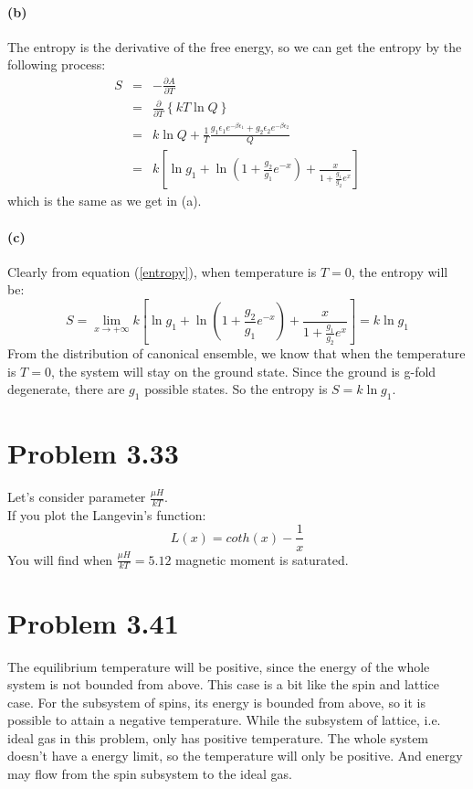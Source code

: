 \documentclass{article}
\begin{document}
	\paragraph{(b)}
	The entropy is the derivative of the free energy, so we can get the entropy by the following process:
	\begin{eqnarray}
	S &=& -\frac{\partial A}{\partial T}\nonumber\\
	&=&\frac{\partial}{\partial T}\left\{kT\ln Q\right\}\nonumber\\
	&=&k\ln Q +\frac{1}{T}\frac{g_1\epsilon_1e^{-\beta\epsilon_1}+g_2\epsilon_2e^{-\beta\epsilon_2}}{Q}\nonumber\\
	&=&k\left[\ln g_1 + \ln\left(1+\frac{g_2}{g_1}e^{-x}\right)+\frac{x}{1+\frac{g_1}{g_2}e^x}\right]
	\end{eqnarray}
	which is the same as we get in (a).
	\paragraph{(c)}
	Clearly from equation (\ref{entropy}), when temperature is $T=0$, the entropy will be:
	\begin{equation}
	S = \lim_{x\rightarrow +\infty}k\left[\ln g_1 + \ln\left(1+\frac{g_2}{g_1}e^{-x}\right)+\frac{x}{1+\frac{g_1}{g_2}e^x}\right]=k\ln g_1
	\end{equation}
	From the distribution of canonical ensemble, we know that when the temperature is $T=0$, the system will stay on the ground state. Since the ground is g-fold degenerate, there are $g_1$ possible states. So the entropy is $S = k\ln g_1$.


\section*{Problem 3.33} %
\label{sec:problem_3_33}
	Let's consider parameter $\frac{\mu H}{kT}$.\\
	If you plot the Langevin's function:
	$$L(x)=coth(x)-\frac{1}{x}$$ 
	You will find when $\frac{\mu H}{kT}=5.12$ magnetic moment is saturated.\\



\section*{Problem 3.41}
	The equilibrium temperature will be positive, since the energy of the whole system is not bounded from above. This case is a bit like the spin and lattice case. For the subsystem of spins, its energy is bounded from above, so it is possible to attain a negative temperature. While the subsystem of lattice, i.e. ideal gas in this problem, only has positive temperature. The whole system doesn't have a energy limit, so the temperature will only be positive. And energy may flow from the spin subsystem to the ideal gas.
\end{document}
